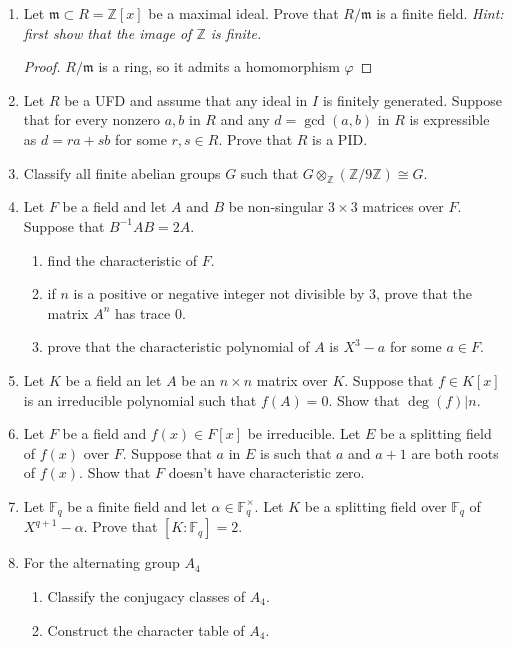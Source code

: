 \documentclass[11pt,letterpaper]{report}
\newcommand{\integers}{\mathbb{Z}}
\newcommand{\field}{\mathbb{F}}
\begin{document}
\begin{enumerate}
	\item Let $\mathfrak{m}\subset R = \integers[x]$ be a maximal ideal. Prove that $R/\mathfrak{m}$ is a finite field. \textit{Hint: first show that the image of $\integers$ is finite.}
	\begin{proof}
		$R/\mathfrak{m}$ is a ring, so it admits a homomorphism $\varphi$
	\end{proof}
	\item Let $R$ be a UFD and assume that any ideal in $I$ is finitely generated. Suppose that for every nonzero $a,b$ in $R$ and any $d = \gcd(a,b)$ in $R$ is expressible as $d = ra+sb$ for some $r,s\in R$. Prove that $R$ is a PID.
	\item Classify all finite abelian groups $G$ such that $G\otimes_\integers (\integers/9\integers)\cong G$.
	\item Let $F$ be a field and let $A$ and $B$ be non-singular $3\times 3$ matrices over $F$. Suppose that $B^{-1}AB = 2A$.
	\begin{enumerate}
		\item find the characteristic of $F$.
		\item if $n$ is a positive or negative integer not divisible by 3, prove that the matrix $A^n$ has trace 0.
		\item prove that the characteristic polynomial of $A$ is $X^3-a$ for some $a\in F$.
	\end{enumerate}
	\item Let $K$ be a field an let $A$ be an $n\times n$ matrix over $K$. Suppose that $f\in K[x]$ is an irreducible polynomial such that $f(A) = 0$. Show that $\deg(f)|n$.
	\item Let $F$ be a field and $f(x)\in F[x]$ be irreducible. Let $E$ be a splitting field of $f(x)$ over $F$. Suppose that $a$ in $E$ is such that $a$ and $a+1$ are both roots of $f(x)$. Show that $F$ doesn't have characteristic zero.
	\item Let $\field_q$ be a finite field and let $\alpha\in \field_q^\times$. Let $K$ be a splitting field over $\field_q$ of $X^{q+1}-\alpha$. Prove that $[K: \field_q] = 2$.
	\item For the alternating group $A_4$
	\begin{enumerate}
		\item Classify the conjugacy classes of $A_4$.
		\item Construct the character table of $A_4$.
	\end{enumerate}
\end{enumerate}
\end{document}

